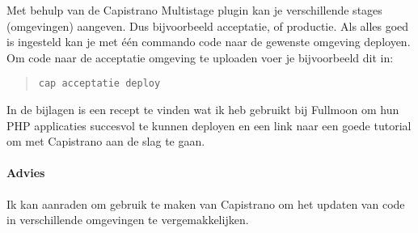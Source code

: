 Met behulp van de Capistrano Multistage plugin\cite{capistranomultistage} kan je verschillende stages (omgevingen) aangeven. Dus bijvoorbeeld acceptatie, of productie. Als alles goed is ingesteld kan je met één commando code naar de gewenste omgeving deployen. Om code naar de acceptatie omgeving te uploaden voer je bijvoorbeeld dit in:

\begin{quote}
  \texttt{cap acceptatie deploy}
\end{quote}

In de bijlagen is een recept te vinden wat ik heb gebruikt bij Fullmoon om hun PHP applicaties succesvol te kunnen deployen en een link naar een goede tutorial om met Capistrano aan de slag te gaan.

\paragraph{Advies} Ik kan aanraden om gebruik te maken van Capistrano om het updaten van code in verschillende omgevingen te vergemakkelijken.
